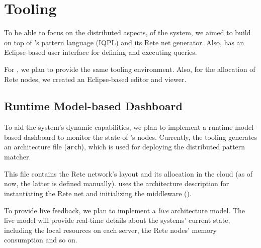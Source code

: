 \section{Tooling}
\label{tooling}   

To be able to focus on the distributed aspects, of the system, we aimed to build \iqd{} on top of \eiq{}'s pattern language (IQPL) and its Rete net generator. Also, \eiq{} has an Eclipse-based user interface for defining and executing queries.

For \iqd{}, we plan to provide the same tooling environment. Also, for the allocation of Rete nodes, we created an Eclipse-based editor and viewer.








\subsection{Runtime Model-based Dashboard}
\label{dashboard}

To aid the system's dynamic capabilities, we plan to implement a runtime model-based dashboard to monitor the state of \iqd{}'s nodes. Currently, the \iqd{} tooling generates an architecture file (\texttt{arch}), which is used for deploying the distributed pattern matcher.

This file contains the Rete network's layout and its allocation in the cloud (as of now, the latter is defined manually). \iqd{} uses the architecture description for instantiating the Rete net and initializing the middleware ().


To provide live feedback, we plan to implement a \emph{live} architecture model. The live model will provide real-time details about the systems' current state, including the local resources on each server, the Rete nodes' memory consumption and so on.
